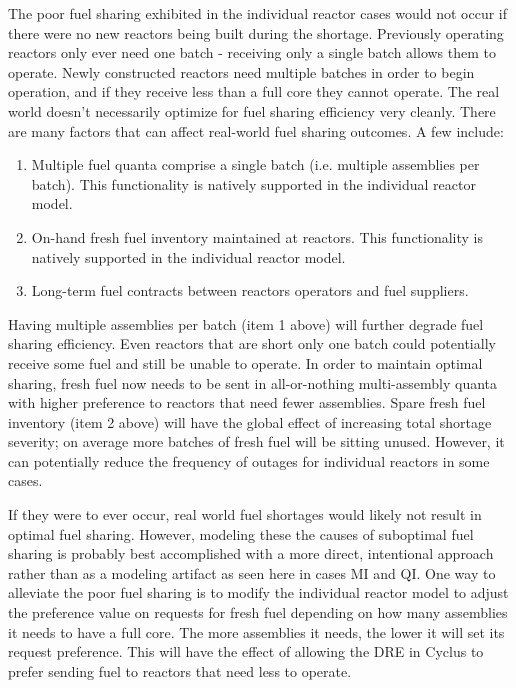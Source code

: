 \documentclass{style}
\begin{document}
The poor fuel sharing exhibited in the individual reactor cases would not
occur if there were no new reactors being built during the shortage.
Previously operating reactors only ever need one batch - receiving only a
single batch allows them to operate.  Newly constructed reactors need multiple
batches in order to begin operation, and if they receive less than a full core
they cannot operate.  The real world doesn't necessarily optimize for fuel
sharing efficiency very cleanly. There are many factors that can affect
real-world fuel sharing outcomes.  A few include:

\begin{enumerate}

    \item Multiple fuel quanta comprise a single batch (i.e. multiple
        assemblies per batch). This functionality is natively supported in the
        individual reactor model.

    \item On-hand fresh fuel inventory maintained at reactors. This
        functionality is natively supported in the individual reactor model.

    \item Long-term fuel contracts between reactors operators and fuel
        suppliers.

\end{enumerate}

Having multiple assemblies per batch (item 1 above) will further degrade fuel
sharing efficiency.  Even reactors that are short only one batch could
potentially receive some fuel and still be unable to operate.  In order to
maintain optimal sharing, fresh fuel now needs to be sent in all-or-nothing
multi-assembly quanta with higher preference to reactors that need fewer
assemblies.  Spare fresh fuel inventory (item 2 above) will have the global
effect of increasing total shortage severity; on average more batches of fresh
fuel will be sitting unused.  However, it can potentially reduce the frequency
of outages for individual reactors in some cases.

If they were to ever occur, real world fuel shortages would likely not result
in optimal fuel sharing. However, modeling these the causes of suboptimal fuel
sharing is probably best accomplished with a more direct, intentional approach
rather than as a modeling artifact as seen here in cases MI and QI.  One way to
alleviate the poor fuel sharing is to modify the individual reactor model to
adjust the preference value on requests for fresh fuel depending on how many
assemblies it needs to have a full core.  The more assemblies it needs, the
lower it will set its request preference.  This will have the effect of
allowing the DRE in Cyclus to prefer sending
fuel to reactors that need less to operate.
\end{document}
